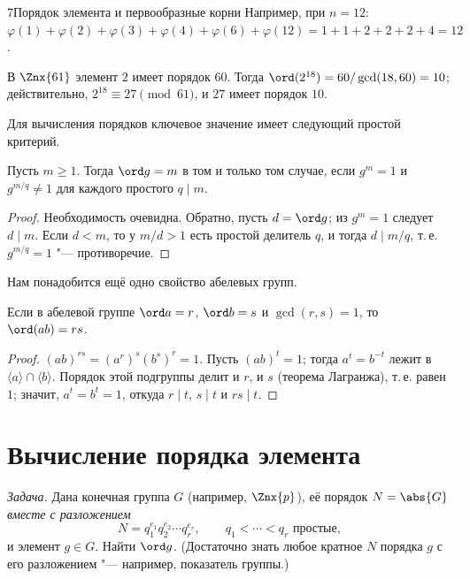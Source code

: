 \begin{lecture}{7}{Порядок элемента и первообразные корни}
Например, при $n = 12$: $\varphi(1) + \varphi(2) + \varphi(3) + \varphi(4) + \varphi(6) +
\varphi(12) = 1 + 1 + 2 + 2 + 2 + 4 = 12$.

\begin{example}
В $\Znx{61}$ элемент $2$ имеет порядок $60$. Тогда $\ord(2^{18}) = 60/\gcd(18, 60) = 10$;
действительно, $2^{18} \equiv 27 \pmod{61}$, и $27$ имеет порядок $10$.
\end{example}

Для вычисления порядков ключевое значение имеет следующий простой критерий.

\begin{lemma}\label{l7:order-test}
Пусть $m \ge 1$. Тогда $\ord g = m$ в том и только том случае, если $g^m = 1$ и
$g^{m/q} \ne 1$ для каждого простого $q \mid m$.
\end{lemma}

\begin{proof}
Необходимость очевидна. Обратно, пусть $d = \ord g$; из $g^m = 1$ следует $d \mid m$. Если
$d < m$, то у $m/d > 1$ есть простой делитель $q$, и тогда $d \mid m/q$, т.\,е. $g^{m/q} = 1$
"--- противоречие.
\end{proof}

Нам понадобится ещё одно свойство абелевых групп.

\begin{lemma}\label{l7:coprime-product}
Если в абелевой группе $\ord a = r$, $\ord b = s$ и $\gcd(r, s) = 1$, то $\ord(ab) = rs$.
\end{lemma}

\begin{proof}
$(ab)^{rs} = (a^r)^s (b^s)^r = 1$. Пусть $(ab)^t = 1$; тогда $a^t = b^{-t}$ лежит в
$\langle a \rangle \cap \langle b \rangle$. Порядок этой подгруппы делит и $r$, и $s$ (теорема
Лагранжа), т.\,е. равен $1$; значит, $a^t = b^t = 1$, откуда $r \mid t$, $s \mid t$ и
$rs \mid t$.
\end{proof}


\section{Вычисление порядка элемента}\label{l7:order}

\emph{Задача.} Дана конечная группа $G$ (например, $\Znx{p}$), её порядок
$N = \abs{G}$ \emph{вместе с разложением}
\[
  N = q_1^{e_1} q_2^{e_2} \cdots q_r^{e_r}, \qquad q_1 < \cdots < q_r \text{ простые},
\]
и элемент $g \in G$. Найти $\ord g$. (Достаточно знать любое кратное $N$ порядка $g$ с его
разложением "--- например, показатель группы.)


\end{lecture}
